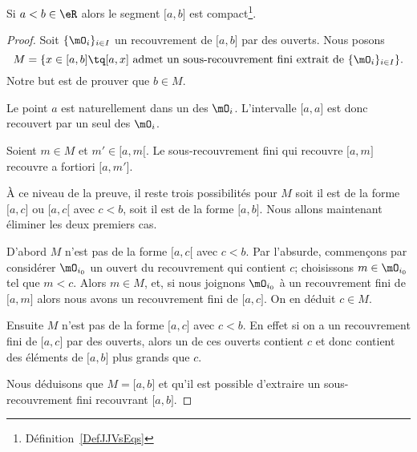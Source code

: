 \begin{lemma}\label{LemOACGWxV}
    Si \( a<b\in \eR\) alors le segment \( \mathopen[ a , b \mathclose]\) est compact\footnote{Définition~\ref{DefJJVsEqs}}.
\end{lemma}

\begin{proof}
    Soit \( \{ \mO_i \}_{i\in I}\) un recouvrement de \( \mathopen[ a , b \mathclose]\) par des ouverts. Nous posons
    \begin{equation}
        M=\{ x\in\mathopen[ a , b \mathclose]\tq \mathopen[ a , x \mathclose] \text{ admet un sous-recouvrement fini extrait de } \{ \mO_i \}_{i\in I} \}.
    \end{equation}
    Notre but est de prouver que \( b\in M\).
    \begin{subproof}

    \item[\( a\) est dans \( M\)]

        Le point \( a\) est naturellement dans un des \( \mO_i\). L'intervalle \( \mathopen[ a , a \mathclose]\) est donc recouvert par un seul des \( \mO_i\).

    \item[\( M\) est un intervalle]

        Soient \( m\in M\) et \( m'\in\mathopen[ a , m [\). Le sous-recouvrement fini qui recouvre \( \mathopen[ a , m \mathclose]\) recouvre a fortiori \( \mathopen[ a , m' \mathclose]\).

    \item[Les trois possibilités restantes]
        À ce niveau de la preuve, il reste trois possibilités pour \( M\) soit il est de la forme \( \mathopen[ a , c \mathclose]\) ou \( \mathopen[ a , c [\) avec \( c<b\), soit il est de la forme \( \mathopen[ a , b \mathclose]\). Nous allons maintenant éliminer les deux premiers cas.

    \item[Ce que \( M\) n'est pas]

        D'abord \( M\) n'est pas de la forme \( \mathopen[ a , c [\) avec \( c<b\). Par l'absurde, commençons par considérer \( \mO_{i_0}\) un ouvert du recouvrement qui contient \( c\); choisissons  \(m \in \mO_{i_0}\) tel que \( m<c\). Alors \( m \in M \), et, si nous joignons \( \mO_{i_0}\) à un recouvrement fini de \( \mathopen[ a , m \mathclose]\) alors nous avons un recouvrement fini de \( \mathopen[ a , c \mathclose]\). On en déduit \( c\in M\).

        Ensuite \( M\) n'est pas de la forme \( \mathopen[ a , c \mathclose]\) avec \( c<b\). En effet si on a un recouvrement fini de \( \mathopen[ a , c \mathclose]\) par des ouverts, alors un de ces ouverts contient \( c\) et donc contient des éléments de \( \mathopen[ a , b \mathclose]\) plus grands que \( c\).
    \end{subproof}
    Nous déduisons que \( M=\mathopen[ a , b \mathclose]\) et qu'il est possible d'extraire un sous-recouvrement fini recouvrant \( \mathopen[ a , b \mathclose]\).
\end{proof}

